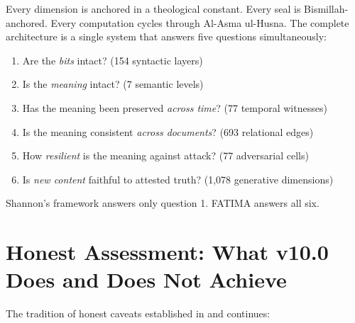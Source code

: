 \documentclass[11pt,a4paper]{article}
\begin{document}
Every dimension is anchored in a theological constant. Every seal is Bismillah-anchored. Every computation cycles through Al-Asma ul-Husna. The complete architecture is a single system that answers five questions simultaneously:

\begin{enumerate}[nosep]
    \item Are the \textit{bits} intact? (154 syntactic layers)
    \item Is the \textit{meaning} intact? (7 semantic levels)
    \item Has the meaning been preserved \textit{across time}? (77 temporal witnesses)
    \item Is the meaning consistent \textit{across documents}? (693 relational edges)
    \item How \textit{resilient} is the meaning against attack? (77 adversarial cells)
    \item Is \textit{new content} faithful to attested truth? (1,078 generative dimensions)
\end{enumerate}

Shannon's framework answers only question 1. FATIMA answers all six.


\section{Honest Assessment: What v10.0 Does and Does Not Achieve}

The tradition of honest caveats established in \cite{arfeen2026crossing} and \cite{arfeen2026evolution} continues:
\end{document}
